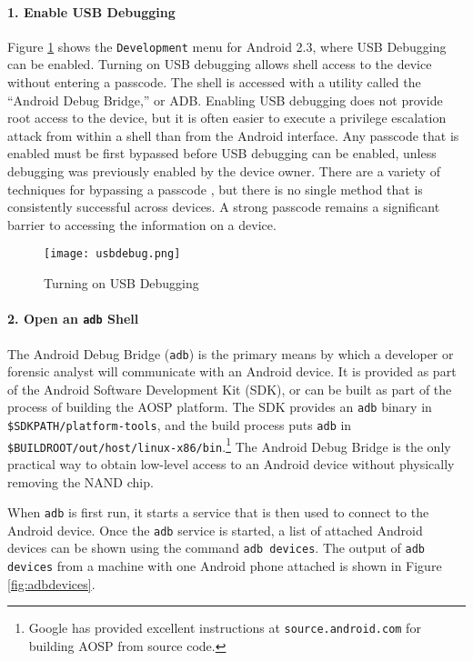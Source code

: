 \paragraph {1. 
Enable USB Debugging} Figure \ref{fig:usbdebug} shows the \texttt{Development} menu for Android 2.3, where USB Debugging can be
enabled.  Turning on USB debugging allows shell access to the device without entering a passcode. The shell is accessed with a
utility called the ``Android Debug Bridge,'' or ADB. Enabling USB debugging does not provide root access to the device, but it is
often easier to execute a privilege escalation attack from within a shell than from the Android interface. Any passcode that is
enabled must be first bypassed before USB debugging can be enabled, unless debugging was previously enabled by the device owner.
There are a variety of techniques for bypassing a passcode \cite{hoog, lockscreenbypass0, lockscreenbypass1, lockscreenbypass2}, but
there is no single method that is consistently successful across devices.  A strong passcode remains a significant barrier to
accessing the information on a device.

\begin{figure}[htpb]
\caption{Turning on USB Debugging}
\begin{center}\texttt{[image: usbdebug.png]}\end{center}
\label{fig:usbdebug}
\end{figure}

\paragraph {2. Open an \texttt{adb}  Shell}

The Android Debug Bridge (\texttt{adb}) is the primary means by which a developer or forensic analyst will communicate with an
Android device. It is provided as part of the Android Software Development Kit (SDK), or can be built as part of the process of
building the AOSP platform. The SDK provides an \texttt{adb} binary in \texttt{\$SDKPATH/platform-tools}, and the build process puts
\texttt{adb} in \texttt{\$BUILDROOT/out/host/linux-x86/bin}.\footnote{Google has provided excellent instructions at
\texttt{source.android.com} for building AOSP from source code.}  The Android Debug Bridge is the only practical way to obtain
low-level access to an Android device without physically removing the NAND chip.

When \texttt{adb} is first run, it starts a service that is then used to connect to the Android device. 
Once the \texttt{adb} service is started, a list of attached Android devices can be shown using the command \texttt{adb devices}. 
The output of \texttt{adb devices} from a machine with one Android phone attached is shown in Figure \ref{fig:adbdevices}.

